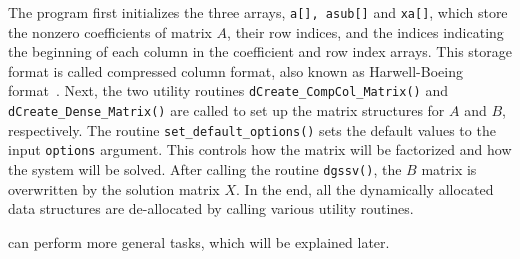 The program first initializes the three arrays,
{\tt a[], asub[]} and {\tt xa[]}, which store the nonzero coefficients of
matrix $A$, their row indices, and the indices indicating the beginning of
each column in the coefficient and row index arrays.
This storage format is called compressed column format, also known as
Harwell-Boeing format~\cite{duffgrimes92}.
Next, the two utility routines
{\tt dCreate\_CompCol\_Matrix()} and {\tt dCreate\_Dense\_Matrix()}
are called to set up the matrix structures for $A$ and $B$, respectively.
The routine {\tt set\_default\_options()} sets the default values
to the input {\tt options} argument. This controls how the matrix
will be factorized and how the system will be solved.
After calling the {\superlu} routine {\tt dgssv()}, the $B$ matrix is
overwritten by the solution matrix $X$.
In the end, all the dynamically allocated data structures are de-allocated
by calling various utility routines.%

{\superlu} can perform more general tasks, which will be
explained later.


